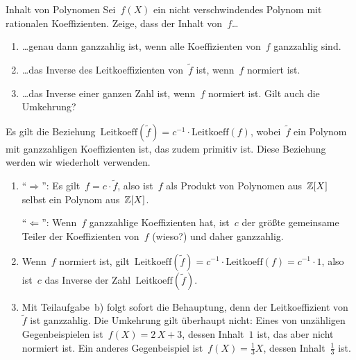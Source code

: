 \documentclass{algblatt}
\begin{document}
\begin{aufgabe}{Inhalt von Polynomen}
Sei~$f(X)$ ein nicht verschwindendes Polynom mit rationalen Koeffizienten. Zeige, dass der
Inhalt von~$f$\ldots
\begin{enumerate}
\item \ldots genau dann ganzzahlig ist, wenn alle
Koeffizienten von~$f$ ganzzahlig sind.
\item \ldots das Inverse des Leitkoeffizienten
von~$\widetilde f$ ist, wenn~$f$ normiert ist.
\item \ldots das Inverse einer ganzen Zahl ist,
wenn~$f$ normiert ist. Gilt auch die Umkehrung?
\end{enumerate}

\begin{loesung}
\newcommand{\leit}[1]{\mathrm{Leitkoeff}(#1)}%
Es gilt die Beziehung~$\leit{\widetilde f} = c^{-1} \cdot \leit{f}$,
wobei~$\widetilde f$ ein Polynom mit ganzzahligen Koeffizienten ist, das zudem
primitiv ist. Diese Beziehung werden wir wiederholt verwenden.
\begin{enumerate}
\item "`$\Longrightarrow$"': Es gilt~$f = c \cdot \widetilde f$, also ist~$f$ als
Produkt von Polynomen aus~$\mathbb{Z}[X]$ selbst ein Polynom aus~$\mathbb{Z}[X]$.

"`$\Longleftarrow$"': Wenn~$f$ ganzzahlige Koeffizienten hat, ist~$c$ der
größte gemeinsame Teiler der Koeffizienten von~$f$ (wieso?) und daher ganzzahlig.

\item Wenn~$f$ normiert ist, gilt~$\leit{\widetilde f} = c^{-1} \cdot
\leit{f} = c^{-1} \cdot 1$, also ist~$c$ das Inverse der Zahl~$\leit{\widetilde f}$.

\item Mit Teilaufgabe~b) folgt sofort die Behauptung, denn der Leitkoeffizient
von~$\widetilde f$ ist ganzzahlig. Die Umkehrung gilt überhaupt nicht: Eines
von unzähligen Gegenbeispielen ist~$f(X) = 2\,X + 3$, dessen Inhalt~$1$ ist,
das aber nicht normiert ist. Ein anderes Gegenbeispiel ist~$f(X) = \frac{1}{3}
X$, dessen Inhalt~$\frac{1}{3}$ ist.
\end{enumerate}
\end{loesung}
\end{aufgabe}
\end{document}
